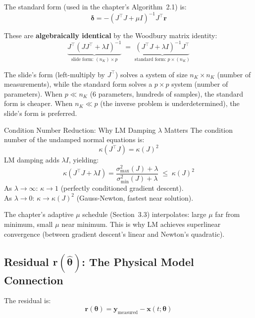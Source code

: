 \documentclass[12pt,a4paper]{article}
\newcommand{\thetahat}{\hat{\bm{\theta}}}
\newcommand{\rvec}{\mathbf{r}}
\begin{document}
The standard form (used in the chapter's Algorithm~2.1) is:
\begin{equation}
  \bm{\delta} = -(J^\top J + \mu I)^{-1} J^\top \rvec
  \label{eq:standard_lm}
\end{equation}

These are \textbf{algebraically identical} by the Woodbury matrix identity:
\begin{equation}
  \underbrace{J^\top(JJ^\top + \lambda I)^{-1}}_{\text{slide form: }(n_K) \times p}
  \;=\;
  \underbrace{(J^\top J + \lambda I)^{-1} J^\top}_{\text{standard form: }p \times (n_K)}
  \label{eq:woodbury}
\end{equation}

The slide's form (left-multiply by $J^\top$) solves a system of size
$n_K \times n_K$ (number of measurements), while the standard form solves
a $p \times p$ system (number of parameters).  When $p \ll n_K$ (6 parameters,
hundreds of samples), the standard form is cheaper.  When $n_K \ll p$ (the
inverse problem is underdetermined), the slide's form is preferred.

\begin{formulabox}{Condition Number Reduction: Why LM Damping $\lambda$ Matters}
The condition number of the undamped normal equations is:
\[
  \kappa(J^\top J) = \kappa(J)^2
\]
LM damping adds $\lambda I$, yielding:
\[
  \kappa(J^\top J + \lambda I) = \frac{\sigma_{\max}^2(J) + \lambda}{\sigma_{\min}^2(J) + \lambda}
  \;\leq\; \kappa(J)^2
\]
As $\lambda \to \infty$: $\kappa \to 1$ (perfectly conditioned gradient descent).\\
As $\lambda \to 0$: $\kappa \to \kappa(J)^2$ (Gauss-Newton, fastest near solution).

The chapter's adaptive $\mu$ schedule (Section~3.3) interpolates: large $\mu$ far
from minimum, small $\mu$ near minimum.  This is why LM achieves superlinear
convergence (between gradient descent's linear and Newton's quadratic).
\end{formulabox}

\subsection{Residual $\rvec(\thetahat)$: The Physical Model Connection}

The residual is:
\begin{equation}
  \rvec(\bm{\theta}) = \mathbf{y}_\mathrm{measured} - \mathbf{x}(t;\bm{\theta})
  \label{eq:residual}
\end{equation}
\end{document}
